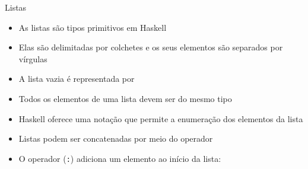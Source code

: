 \begin{frame}[fragile]{Listas}

    \begin{itemize}
        \item As listas são tipos primitivos em Haskell

        \item Elas são delimitadas por colchetes e os seus elementos são separados
            por vírgulas 


        \item A lista vazia é representada por 

        \item Todos os elementos de uma lista devem ser do mesmo tipo

        \item Haskell oferece uma notação que permite a enumeração dos elementos da lista


        \item Listas podem ser concatenadas por meio do operador 


        \item O operador  (\texttt{:}) adiciona um elemento ao início da lista:

    \end{itemize}

\end{frame}

